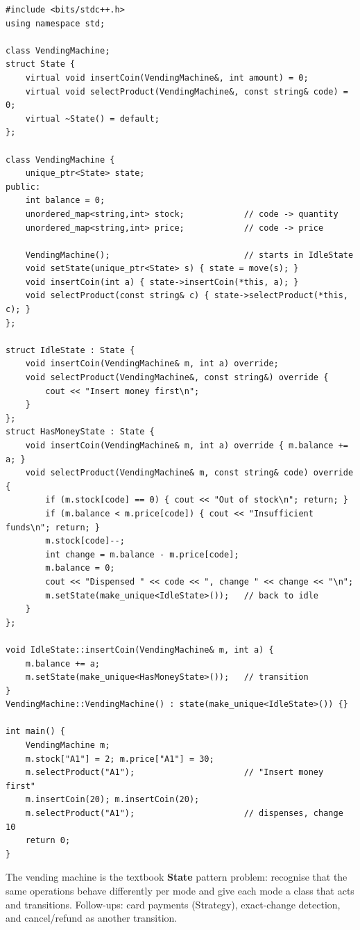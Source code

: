 \begin{lstlisting}
#include <bits/stdc++.h>
using namespace std;

class VendingMachine;
struct State {
    virtual void insertCoin(VendingMachine&, int amount) = 0;
    virtual void selectProduct(VendingMachine&, const string& code) = 0;
    virtual ~State() = default;
};

class VendingMachine {
    unique_ptr<State> state;
public:
    int balance = 0;
    unordered_map<string,int> stock;            // code -> quantity
    unordered_map<string,int> price;            // code -> price

    VendingMachine();                           // starts in IdleState
    void setState(unique_ptr<State> s) { state = move(s); }
    void insertCoin(int a) { state->insertCoin(*this, a); }
    void selectProduct(const string& c) { state->selectProduct(*this, c); }
};

struct IdleState : State {
    void insertCoin(VendingMachine& m, int a) override;
    void selectProduct(VendingMachine&, const string&) override {
        cout << "Insert money first\n";
    }
};
struct HasMoneyState : State {
    void insertCoin(VendingMachine& m, int a) override { m.balance += a; }
    void selectProduct(VendingMachine& m, const string& code) override {
        if (m.stock[code] == 0) { cout << "Out of stock\n"; return; }
        if (m.balance < m.price[code]) { cout << "Insufficient funds\n"; return; }
        m.stock[code]--;
        int change = m.balance - m.price[code];
        m.balance = 0;
        cout << "Dispensed " << code << ", change " << change << "\n";
        m.setState(make_unique<IdleState>());   // back to idle
    }
};

void IdleState::insertCoin(VendingMachine& m, int a) {
    m.balance += a;
    m.setState(make_unique<HasMoneyState>());   // transition
}
VendingMachine::VendingMachine() : state(make_unique<IdleState>()) {}

int main() {
    VendingMachine m;
    m.stock["A1"] = 2; m.price["A1"] = 30;
    m.selectProduct("A1");                      // "Insert money first"
    m.insertCoin(20); m.insertCoin(20);
    m.selectProduct("A1");                      // dispenses, change 10
    return 0;
}
\end{lstlisting}

\begin{takeawaybox}
The vending machine is the textbook \textbf{State} pattern problem:
recognise that the same operations behave differently per mode and give
each mode a class that acts and transitions. Follow-ups: card payments
(Strategy), exact-change detection, and cancel/refund as another
transition.
\end{takeawaybox}
